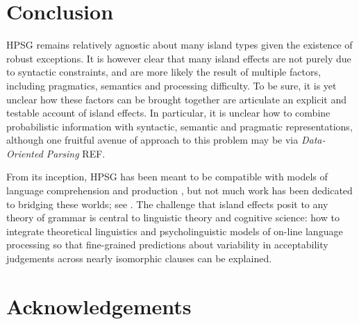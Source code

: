\documentclass[output=paper]{langsci/langscibook}
\begin{document}
\section{Conclusion}

HPSG remains relatively agnostic about many island types given the existence of robust exceptions.
It is however clear that many island effects are not purely due to syntactic constraints, and are more likely
the result of multiple factors, including pragmatics, semantics and processing difficulty.
To be sure, it is yet unclear how these factors can be brought together are articulate an explicit
and testable account of island effects. In particular, it is unclear how to combine probabilistic information with syntactic, semantic and pragmatic representations, although one fruitful avenue of approach to this problem may be via  \emph{Data-Oriented Parsing} REF.  


From its inception, HPSG has been meant to be compatible with models of language comprehension and production \citep{sagser,Sag:Wasow:ta,Sag:Wasow:ta2}, but not much work has been dedicated to bridging these worlds; see . The challenge that island effects posit to any theory of grammar is central to linguistic theory and cognitive science: how to integrate theoretical linguistics and psycholinguistic models of on-line language processing so that fine-grained predictions about variability in acceptability judgements across nearly isomorphic clauses can be explained.


 
\section*{Acknowledgements}

{\sloppy
\printbibliography[heading=subbibliography,notkeyword=this] 
}
\end{document}
